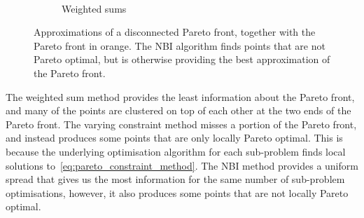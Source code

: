 \documentclass[main.tex]{subfiles}
\begin{document}
\begin{example}
\begin{figure}[htbp]
\begin{subfigure}[t]{.5\textwidth}
    \end{subfigure}\\[1em]
    \begin{subfigure}[t]{.5\textwidth}
      \caption{Weighted sums}\label{fig:pareto_disconnected_ws}
    \end{subfigure}
    \caption[Approximations of a disconnected Pareto front]{Approximations of a disconnected Pareto front, together
      with the Pareto front in orange.
      The NBI algorithm finds points that are not Pareto optimal, but
      is otherwise providing the best approximation of the Pareto front.
    }\label{fig:pareto_disconnected}
  \end{figure}

  The weighted sum method provides the least information about the
  Pareto front, and many of the points are clustered on top of each
  other at the two ends of the Pareto front.
  The varying constraint method misses a portion of the Pareto front,
  and instead produces some points that are only
  locally Pareto optimal. This is because the underlying optimisation
  algorithm for each sub-problem finds local solutions
  to~\eqref{eq:pareto_constraint_method}.
  The NBI method provides a uniform spread that gives us the most
  information for the same number of sub-problem optimisations,
  however, it also produces some points that are not locally
  Pareto optimal.
\end{example}
\end{document}
